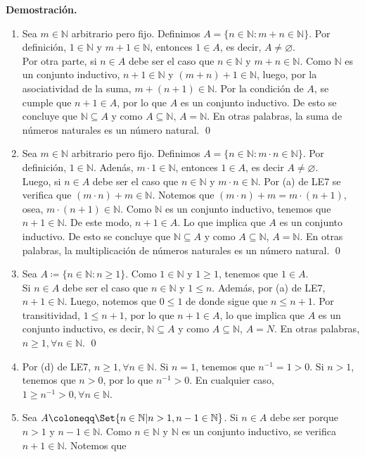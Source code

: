 \documentclass[11pt]{article}
\newcommand{\N}{\mathbb{N}}
\let\emptyset\varnothing
\let\set\Set
\begin{document}
\textbf{Demostración.}

\begin{enumerate}[label=\alph*)]
    \item Sea $m\in \N$ arbitrario pero fijo. Definimos $A=\{ n\in \N : m+n \in \N \}$. Por definición, $1\in \N$ y $m+1\in \N$, entonces $1\in A$, es decir, $A\neq \emptyset$. \\[5pt] Por otra parte, si $n\in A$ debe ser el caso que $n\in \N$ y $m+n\in \N$. Como $\N$ es un conjunto inductivo, $n+1 \in \N$ y $(m+n)+1 \in \N$, luego, por la asociatividad de la suma, $m+(n+1)\in \N$. Por la condición de $A$, se cumple que $n+1\in A$, por lo que $A$ es un conjunto inductivo. De esto se concluye que $\N\subseteq A$ y como $A\subseteq \N$, $A=\N$. En otras palabras, la suma de números naturales es un número natural. \qed
    \item Sea $m\in \N$ arbitrario pero fijo. Definimos $A=\{n\in \N: m\cdot n \in \N\}$. Por definición, $1 \in \N$. Adenás, $m\cdot 1 \in \N$, entonces $1 \in A$, es decir $A \neq \emptyset$.\\[5pt] 
    Luego, si $n \in A$ debe ser el caso que $n\in \N$ y $m \cdot n \in \N$. Por (a) de LE7 se verifica que $(m \cdot n) + m \in \N$. Notemos que $(m \cdot n) + m=m \cdot (n+1)$, osea, $m \cdot (n+1) \in \N$. Como $\N$ es un conjunto inductivo, tenemos que $n+1\in \N$. De este modo, $n+1\in A$. Lo que implica que $A$ es un conjunto inductivo. De esto se concluye que $\N \subseteq A$ y como $A\subseteq \N$, $A=\N$. En otras palabras, la multiplicación de números naturales es un número natural. \qed
    \item Sea $A\coloneqq \{n\in \N: n\geq 1\}$. Como $1\in \N$ y $1\geq 1$, tenemos que $1\in A$.\\[5pt]
    Si $n\in A$ debe ser el caso que $n\in \N$ y $1\leq n$. Además, por (a) de LE7, $n+1\in \N$. Luego, notemos que $0 \leq 1$ de donde sigue que $n \leq n+1$. Por transitividad, $1\leq n+1$, por lo que $n+1\in A$, lo que implica que $A$ es un conjunto inductivo, es decir, $\N\subseteq A$ y como $A\subseteq \N$, $A=N$. En otras palabras, $n\geq 1, \forall n\in\N$. \qed
    \item Por (d) de LE7, $n\geq 1, \forall n\in \N$. Si $n=1$, tenemos que $n^{-1}=1>0$. Si $n>1$, tenemos que $n>0$, por lo que $n^{-1}>0$. En cualquier caso, $1\geq n^{-1}>0, \forall n\in \N$.
    \item Sea $A \coloneqq \set{n\in \N | n>1, n-1\in \N}$. Si $n\in A$ debe ser porque $n>1$ y $n-1\in \N$. Como $n\in \N$ y $\N$ es un conjunto inductivo, se verifica $n+1\in\N$. Notemos que \begin{align*}

\end{align*}
\end{enumerate}
\end{document}

